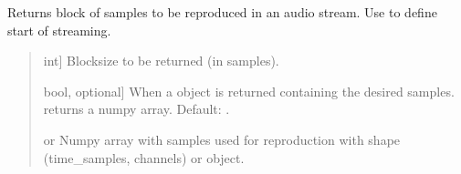 \documentclass[letterpaper,10pt,english]{sphinxmanual}
\begin{document}
\begin{fulllineitems}

\begin{fulllineitems}
\label{\detokenize{classes:dsptoolbox.classes.signal_class.Signal.signal_type}}
\pysigstartsignatures
{}
\pysigstopsignatures
\end{fulllineitems}


\begin{fulllineitems}
\label{\detokenize{classes:dsptoolbox.classes.signal_class.Signal.stream_samples}}
\pysigstartsignatures
{}
\pysigstopsignatures
\sphinxAtStartPar
Returns block of samples to be reproduced in an audio stream. Use
 to define start of streaming.
\begin{quote}\begin{description}
\begin{description}
\sphinxlineitem{\sphinxstylestrong{blocksize\_samples}}{[}int{]}
\sphinxAtStartPar
Blocksize to be returned (in samples).

\sphinxlineitem{\sphinxstylestrong{signal\_mode}}{[}bool, optional{]}
\sphinxAtStartPar
When  a  object is returned containing the desired
samples.  returns a numpy array. Default: .

\end{description}

\begin{description}
\sphinxlineitem{\sphinxstylestrong{sig}}{[} or \sphinxtitleref{Signal}{]}
\sphinxAtStartPar
Numpy array with samples used for reproduction with shape
(time\_samples, channels) or  object.


\end{description}
\end{description}
\end{quote}
\end{fulllineitems}
\end{fulllineitems}
\end{document}
